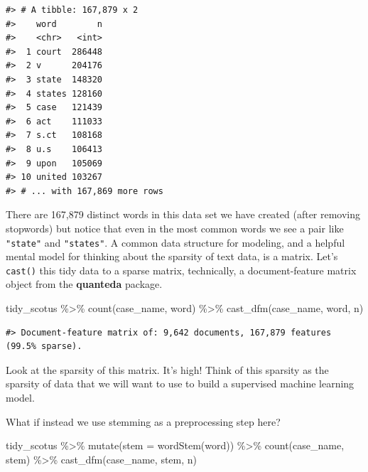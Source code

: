 \documentclass[
]{krantz}
\makeatletter
\newenvironment{Shaded}{\begin{snugshade}}{\end{snugshade}}
\newcommand{\AttributeTok}[1]{\textcolor[rgb]{0.77,0.63,0.00}{#1}}
\newcommand{\FunctionTok}[1]{\textcolor[rgb]{0.00,0.00,0.00}{#1}}
\newcommand{\NormalTok}[1]{#1}
\newcommand{\SpecialCharTok}[1]{\textcolor[rgb]{0.00,0.00,0.00}{#1}}
\newenvironment{kframe}{%
\medskip{}
\setlength{\fboxsep}{.8em}
 \def\at@end@of@kframe{}%
 \ifinner\ifhmode%
  \def\at@end@of@kframe{\end{minipage}}%
  \begin{minipage}{\columnwidth}%
 \fi\fi%
 \def\FrameCommand##1{\hskip\@totalleftmargin \hskip-\fboxsep
 \colorbox{shadecolor}{##1}\hskip-\fboxsep
     \hskip-\linewidth \hskip-\@totalleftmargin \hskip\columnwidth}%
 \MakeFramed {\advance\hsize-\width
   \@totalleftmargin\z@ \linewidth\hsize
   \@setminipage}}%
 {\par\unskip\endMakeFramed%
 \at@end@of@kframe}
\renewenvironment{Shaded}{\begin{kframe}}{\end{kframe}}
\makeatother
\begin{document}
\begin{verbatim}
#> # A tibble: 167,879 x 2
#>    word        n
#>    <chr>   <int>
#>  1 court  286448
#>  2 v      204176
#>  3 state  148320
#>  4 states 128160
#>  5 case   121439
#>  6 act    111033
#>  7 s.ct   108168
#>  8 u.s    106413
#>  9 upon   105069
#> 10 united 103267
#> # ... with 167,869 more rows
\end{verbatim}

There are 167,879 distinct words in this data set we have created (after removing stopwords) but notice that even in the most common words we see a pair like \texttt{"state"} and \texttt{"states"}. A common data structure for modeling, and a helpful mental model for thinking about the sparsity of text data, is a matrix. Let's \texttt{cast()} this tidy data to a sparse matrix, technically, a document-feature matrix object from the \textbf{quanteda} \citep{R-quanteda} package.

\begin{Shaded}
\begin{Highlighting}[]
\NormalTok{tidy\_scotus }\SpecialCharTok{\%\textgreater{}\%}
  \FunctionTok{count}\NormalTok{(case\_name, word) }\SpecialCharTok{\%\textgreater{}\%}
  \FunctionTok{cast\_dfm}\NormalTok{(case\_name, word, n)}
\end{Highlighting}
\end{Shaded}

\begin{verbatim}
#> Document-feature matrix of: 9,642 documents, 167,879 features (99.5% sparse).
\end{verbatim}

Look at the sparsity of this matrix. It's high! Think of this sparsity as the sparsity of data that we will want to use to build a supervised machine learning model.

What if instead we use stemming as a preprocessing step here?

\begin{Shaded}
\begin{Highlighting}[]
\NormalTok{tidy\_scotus }\SpecialCharTok{\%\textgreater{}\%}
  \FunctionTok{mutate}\NormalTok{(}\AttributeTok{stem =} \FunctionTok{wordStem}\NormalTok{(word)) }\SpecialCharTok{\%\textgreater{}\%}
  \FunctionTok{count}\NormalTok{(case\_name, stem) }\SpecialCharTok{\%\textgreater{}\%}
  \FunctionTok{cast\_dfm}\NormalTok{(case\_name, stem, n)}
\end{Highlighting}
\end{Shaded}
\end{document}
